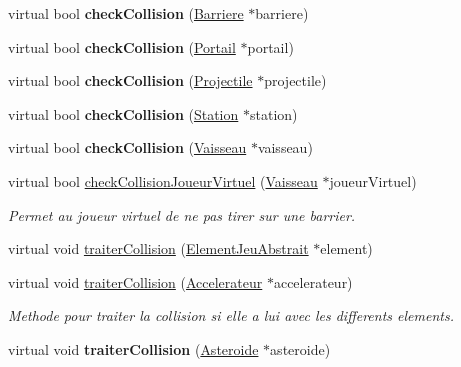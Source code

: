 \begin{DoxyCompactItemize}
\item 
\hypertarget{class_barriere_a3f1b279f8b739e3d06b39d5f6fabc30c}{virtual bool {\bfseries check\-Collision} (\hyperlink{class_barriere}{Barriere} $\ast$barriere)}\label{class_barriere_a3f1b279f8b739e3d06b39d5f6fabc30c}

\item 
\hypertarget{class_barriere_aafcaa584b3a1b994cb94fa192505c659}{virtual bool {\bfseries check\-Collision} (\hyperlink{class_portail}{Portail} $\ast$portail)}\label{class_barriere_aafcaa584b3a1b994cb94fa192505c659}

\item 
\hypertarget{group__inf2990_ga7a3b327a7f30283a2e6b79bc79eb0040}{virtual bool {\bfseries check\-Collision} (\hyperlink{class_projectile}{Projectile} $\ast$projectile)}\label{group__inf2990_ga7a3b327a7f30283a2e6b79bc79eb0040}

\item 
\hypertarget{class_barriere_afd75ee9a9f902f065384684520438feb}{virtual bool {\bfseries check\-Collision} (\hyperlink{class_station}{Station} $\ast$station)}\label{class_barriere_afd75ee9a9f902f065384684520438feb}

\item 
\hypertarget{group__inf2990_ga92014a0e895d1a7dd1c637a2033c2809}{virtual bool {\bfseries check\-Collision} (\hyperlink{class_vaisseau}{Vaisseau} $\ast$vaisseau)}\label{group__inf2990_ga92014a0e895d1a7dd1c637a2033c2809}

\item 
virtual bool \hyperlink{group__inf2990_gac7d66192494684c4e7bcdd00fa9b7ab2}{check\-Collision\-Joueur\-Virtuel} (\hyperlink{class_vaisseau}{Vaisseau} $\ast$joueur\-Virtuel)
\begin{DoxyCompactList}\small\item\em Permet au joueur virtuel de ne pas tirer sur une barrier. \end{DoxyCompactList}\item 
virtual void \hyperlink{group__inf2990_gafc3817554324d494409e24e195088892}{traiter\-Collision} (\hyperlink{class_element_jeu_abstrait}{Element\-Jeu\-Abstrait} $\ast$element)
\item 
\hypertarget{class_barriere_a06cd05cc1baba83705e4999d1109c4b0}{virtual void \hyperlink{class_barriere_a06cd05cc1baba83705e4999d1109c4b0}{traiter\-Collision} (\hyperlink{class_accelerateur}{Accelerateur} $\ast$accelerateur)}\label{class_barriere_a06cd05cc1baba83705e4999d1109c4b0}

\begin{DoxyCompactList}\small\item\em Methode pour traiter la collision si elle a lui avec les differents elements. \end{DoxyCompactList}\item 
\hypertarget{group__inf2990_ga187a42d83d5060894239c0ba34d18a8e}{virtual void {\bfseries traiter\-Collision} (\hyperlink{class_asteroide}{Asteroide} $\ast$asteroide)}\label{group__inf2990_ga187a42d83d5060894239c0ba34d18a8e}


\end{DoxyCompactItemize}
